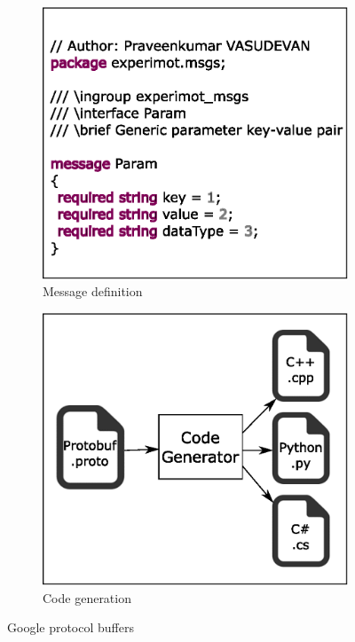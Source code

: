 \begin{figure}[H]
\centering
\begin{subfigure}[t]{0.4\textwidth}
\includegraphics[width=\textwidth]{assets/protobuf_definition.eps}
\caption[Message definition]{Message definition}
\label{fig:protobuf_def}
\end{subfigure}
\begin{subfigure}[t]{0.4\textwidth}
\includegraphics[width=\textwidth]{assets/protobuf_codegen.eps}
\caption[Code generation]{Code generation}
\label{fig:protobuf_codegen}
\end{subfigure}
\caption[Google protocol buffers]{Google protocol buffers}
\label{fig:protobuf}
\end{figure}
